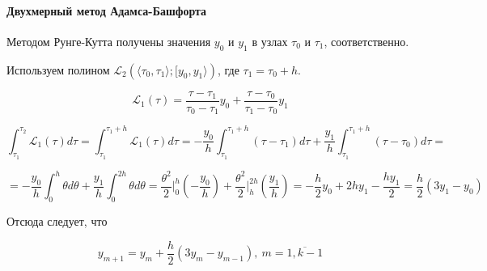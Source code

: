 \documentclass[__main__.tex]{subfiles}
\begin{document}
\paragraph{Двухмерный метод Адамса-Башфорта}

Методом Рунге-Кутта получены значения $y_0$ и $y_1$ в узлах $\tau_0$ и $\tau_1$, соответственно.

Используем полином $\mathcal{L}_2 \left( \langle \tau_0, \tau_1 \rangle; [ y_0,y_1 \rangle \right)$, где $\tau_1 = \tau_0 + h$.

$$
\mathcal{L}_1 \left( \tau\right) = \frac{\tau - \tau_1}{\tau_0 - \tau_1} y_0 + \frac{\tau - \tau_0}{\tau_1 - \tau_0}y_1
$$

$$
\int_{\tau_1}^{\tau_2} \mathcal{L}_1 \left(\tau\right) d\tau = \int_{\tau_1}^{\tau_1+h} \mathcal{L}_1 \left(\tau\right) d\tau = - \frac{y_0}{h} \int_{\tau_1}^{\tau_1+h} \left( \tau - \tau_1 \right) d\tau + \frac{y_1}{h} \int_{\tau_1}^{\tau_1+h} \left( \tau - \tau_0\right)d\tau = 
$$

$$
= - \frac{y_0}{h} \int_{0}^{h} \theta d\theta + \frac{y_1}{h} \int_{0}^{2h} \theta d\theta = \frac{\theta^2}{2} \big|^h_0 \left( - \frac{y_0}{h} \right) + \frac{\theta^2}{2}  \big|^{2h}_h \left( \frac{y_1}{h} \right) = - \frac{h}{2} y_0 + 2h y_1 - \frac{h y_1}{2} = \frac{h}{2} \left(3y_1 - y_0\right)
$$

Отсюда следует, что 

$$
y_{m+1} = y_m + \frac{h}{2} \left(3y_m - y_{m-1}\right), \ m = \overline{1,k-1}
$$
\end{document}
